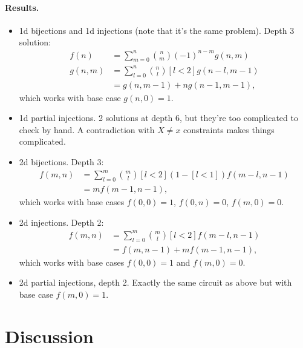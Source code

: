 \paragraph{Results.}
\begin{itemize}
\item 1d bijections and 1d injections (note that it's the same problem). Depth 3 solution:
  \begin{align*}
    f(n) &= \sum_{m=0}^n \binom{n}{m} (-1)^{n-m}g(n, m) \\
    g(n, m) &= \sum_{l=0}^n \binom{n}{l}[l < 2]g(n-l, m-1) \\
    &= g(n, m - 1) + ng(n - 1, m - 1),
  \end{align*}
  which works with base case $g(n, 0) = 1$.
\item 1d partial injections. 2 solutions at depth 6, but they're too complicated to check by hand. A contradiction with $X \ne x$ constraints makes things complicated.
\item 2d bijections. Depth 3:
  \begin{align*}
    f(m, n) &= \sum_{l=0}^m \binom{m}{l} [l < 2] (1 - [l < 1])f(m-l, n-1) \\
    &= mf(m-1, n-1),
  \end{align*}
  which works with base cases $f(0, 0) = 1$, $f(0, n) = 0$, $f(m, 0) = 0$.
\item 2d injections. Depth 2:
  \begin{align*}
    f(m, n) &= \sum_{l=0}^m \binom{m}{l}[l<2]f(m-l, n-1) \\
    &= f(m, n-1) + mf(m-1, n-1),
  \end{align*}
  which works with base cases $f(0, 0) = 1$ and $f(m, 0) = 0$.
\item 2d partial injections, depth 2. Exactly the same circuit as above but with base case $f(m, 0) = 1$.
\end{itemize}

\section{Discussion}

